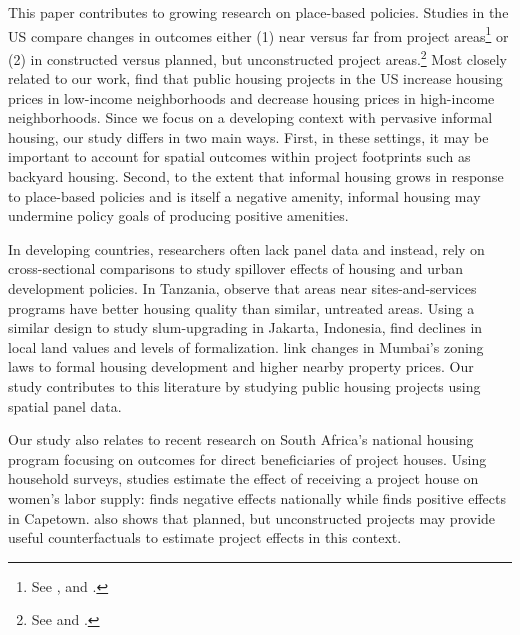 \documentclass[12pt]{article}
\newcommand{\rv}{}
\begin{document}
This paper contributes to growing research on place-based policies.  Studies in the US compare changes in outcomes either (1) near versus far from project areas\footnote{See \cite{rossi2010housing,hornbeck2017creative}, and \cite{diamond2019wants}.} or (2) in constructed versus planned, but unconstructed project areas.\footnote{See \cite{busso2013assessing} and \cite{kline2013local}.}  Most closely related to our work, \cite{diamond2019wants} find that public housing projects in the US increase housing prices in low-income neighborhoods and decrease housing prices in high-income neighborhoods.  \rv{Since we focus on a developing context with pervasive informal housing, our study differs in two main ways.  First, in these settings, it may be important to account for spatial outcomes within project footprints such as backyard housing.  Second, to the extent that informal housing grows in response to place-based policies and is itself a negative amenity, informal housing may undermine policy goals of producing positive amenities.}

In developing countries, researchers often lack panel data and instead, rely on cross-sectional comparisons to study spillover effects of housing and urban development policies.  In Tanzania, \cite{baruah2017planning} observe that areas near sites-and-services programs have better housing quality than similar, untreated areas.  Using a similar design \rv{to study slum-upgrading} in Jakarta, Indonesia, \cite{harari2018slum} find declines in local land values and levels of formalization.  \cite{gechter2020spatial} link changes in Mumbai's zoning laws to formal housing development and higher nearby property prices.   \rv{Our study contributes to this literature by studying public housing projects using spatial panel data.}

Our study also relates to recent research on South Africa's national housing program focusing on outcomes for direct beneficiaries of project houses.  Using household surveys, studies estimate the effect of receiving a project house on women's labor supply: \cite{picarelli2019there}  finds negative effects nationally while \cite{franklin2020enabled} finds positive effects in Capetown.  \cite{franklin2020enabled} also shows that planned, but unconstructed projects may provide useful counterfactuals to estimate project effects in this context.

\end{document}
